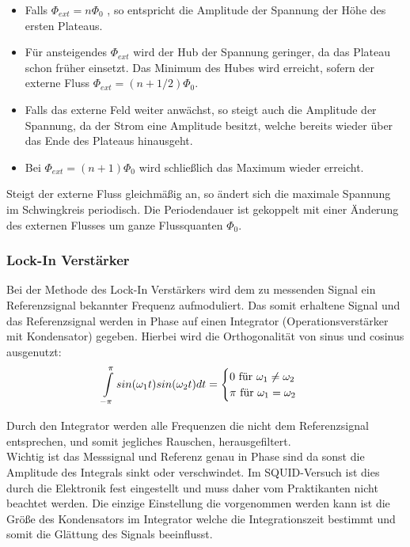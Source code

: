 \documentclass[12pt]{article}
\begin{document}
\begin{itemize}
 \item Falls $\Phi_{ext} = n \Phi_0$ , so entspricht die Amplitude der Spannung der Höhe des ersten Plateaus.
 \item Für ansteigendes $\Phi_{ext}$ wird der Hub der Spannung geringer, da das Plateau schon früher einsetzt.
       Das Minimum des Hubes wird erreicht, sofern der externe Fluss $\Phi_{ext} = (n + 1/2) \Phi_0$.
 \item Falls das externe Feld weiter anwächst, so steigt auch die Amplitude der Spannung, da der Strom eine Amplitude besitzt, welche bereits
       wieder über das Ende des Plateaus hinausgeht.
 \item Bei $\Phi_{ext} = (n + 1) \Phi_0$ wird schließlich das Maximum wieder erreicht.
\end{itemize}

Steigt der externe Fluss gleichmäßig an, so ändert sich die maximale Spannung im Schwingkreis periodisch. Die Periodendauer ist gekoppelt mit einer Änderung des externen Flusses um ganze Flussquanten $\Phi_0$.



\subsubsection{Lock-In Verstärker}
Bei der Methode des Lock-In Verstärkers wird dem zu messenden Signal ein Referenzsignal bekannter Frequenz aufmoduliert.
Das somit erhaltene Signal und das Referenzsignal werden in Phase auf einen Integrator (Operationsverstärker mit Kondensator) gegeben. Hierbei wird die Orthogonalität von
sinus und cosinus ausgenutzt:
\begin{align}
 \int \limits_{-\pi} \limits^{\pi} sin(\omega_1 t)sin(\omega_2 t) dt = \begin{cases} 0 \textnormal{ für } \omega_1\neq\omega_2\\ \pi \textnormal{ für } \omega_1 = \omega_2\end{cases}
\end{align}


Durch den Integrator werden alle Frequenzen die nicht dem Referenzsignal entsprechen, und somit jegliches Rauschen, herausgefiltert. \\

Wichtig ist das Messsignal und Referenz genau in Phase sind da sonst die Amplitude des Integrals sinkt oder verschwindet. Im SQUID-Versuch ist dies durch die Elektronik fest eingestellt und muss daher vom Praktikanten nicht beachtet werden. Die einzige Einstellung die vorgenommen werden kann ist die Größe des Kondensators im Integrator welche die Integrationszeit bestimmt und somit die Glättung des Signals beeinflusst.
\end{document}
